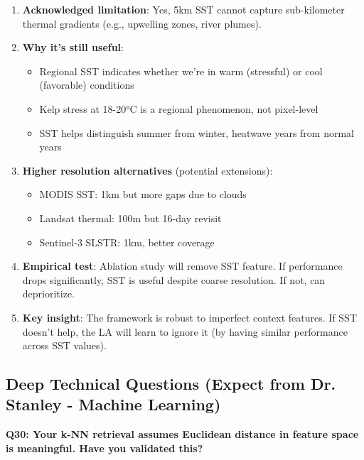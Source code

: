 \documentclass[11pt]{article}
\begin{document}
\begin{enumerate}
    \item \textbf{Acknowledged limitation}: Yes, 5km SST cannot capture sub-kilometer thermal gradients (e.g., upwelling zones, river plumes).

    \item \textbf{Why it's still useful}:
    \begin{itemize}
        \item Regional SST indicates whether we're in warm (stressful) or cool (favorable) conditions
        \item Kelp stress at 18-20°C is a regional phenomenon, not pixel-level
        \item SST helps distinguish summer from winter, heatwave years from normal years
    \end{itemize}

    \item \textbf{Higher resolution alternatives} (potential extensions):
    \begin{itemize}
        \item MODIS SST: 1km but more gaps due to clouds
        \item Landsat thermal: 100m but 16-day revisit
        \item Sentinel-3 SLSTR: 1km, better coverage
    \end{itemize}

    \item \textbf{Empirical test}: Ablation study will remove SST feature. If performance drops significantly, SST is useful despite coarse resolution. If not, can deprioritize.

    \item \textbf{Key insight}: The framework is robust to imperfect context features. If SST doesn't help, the LA will learn to ignore it (by having similar performance across SST values).
\end{enumerate}

\subsection{Deep Technical Questions (Expect from Dr. Stanley - Machine Learning)}

\textbf{Q30: Your k-NN retrieval assumes Euclidean distance in feature space is meaningful. Have you validated this?}
\end{document}
